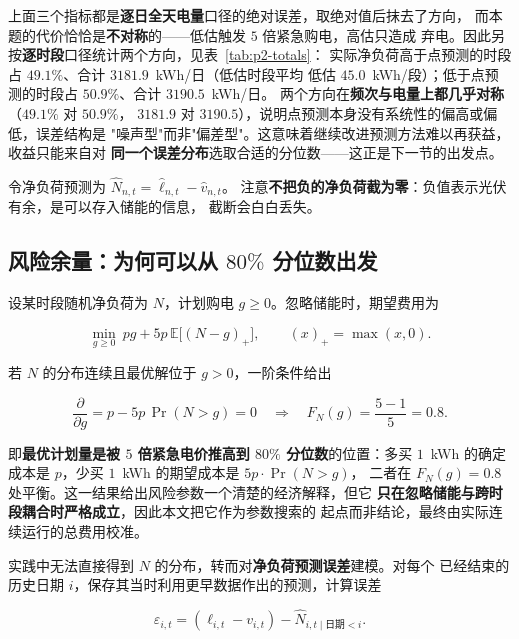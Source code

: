 \documentclass[withoutpreface,bwprint]{cumcmthesis}
\begin{document}
上面三个指标都是\textbf{逐日全天电量}口径的绝对误差，取绝对值后抹去了方向，
而本题的代价恰恰是\textbf{不对称}的——低估触发 $5$ 倍紧急购电，高估只造成
弃电。因此另按\textbf{逐时段}口径统计两个方向，见表~\ref{tab:p2-totals}：
实际净负荷高于点预测的时段占 $49.1\%$、合计 $3181.9$~kWh/日（低估时段平均
低估 $45.0$~kWh/段）；低于点预测的时段占 $50.9\%$、合计 $3190.5$~kWh/日。
两个方向在\textbf{频次与电量上都几乎对称}（$49.1\%$ 对 $50.9\%$，
$3181.9$ 对 $3190.5$），说明点预测本身没有系统性的偏高或偏低，误差结构是
"噪声型"而非"偏差型"。这意味着继续改进预测方法难以再获益，收益只能来自对
\textbf{同一个误差分布}选取合适的分位数——这正是下一节的出发点。

令净负荷预测为 $\widehat N_{n,t}=\widehat\ell_{n,t}-\widehat v_{n,t}$。
注意\textbf{不把负的净负荷截为零}：负值表示光伏有余，是可以存入储能的信息，
截断会白白丢失。

\subsection{风险余量：为何可以从 $80\%$ 分位数出发}

设某时段随机净负荷为 $N$，计划购电 $g\ge 0$。忽略储能时，期望费用为

\begin{equation}
  \min_{g\ge0}\ pg+5p\,\mathbb{E}\bigl[(N-g)_+\bigr],
  \qquad (x)_+=\max(x,0).
  \label{eq:p2-newsvendor}
\end{equation}

若 $N$ 的分布连续且最优解位于 $g>0$，一阶条件给出

\begin{equation}
  \frac{\partial}{\partial g}=p-5p\,\Pr(N>g)=0
  \quad\Longrightarrow\quad
  F_N(g)=\frac{5-1}{5}=0.8 .
  \label{eq:p2-critical}
\end{equation}

即\textbf{最优计划量是被 $5$ 倍紧急电价推高到 $80\%$ 分位数}的位置：多买
$1$~kWh 的确定成本是 $p$，少买 $1$~kWh 的期望成本是 $5p\cdot\Pr(N>g)$，
二者在 $F_N(g)=0.8$ 处平衡。这一结果给出风险参数一个清楚的经济解释，但它
\textbf{只在忽略储能与跨时段耦合时严格成立}，因此本文把它作为参数搜索的
起点而非结论，最终由实际连续运行的总费用校准。

实践中无法直接得到 $N$ 的分布，转而对\textbf{净负荷预测误差}建模。对每个
已经结束的历史日期 $i$，保存其当时利用更早数据作出的预测，计算误差

\begin{equation}
  \varepsilon_{i,t}=(\ell_{i,t}-v_{i,t})-\widehat N_{i,t\mid\text{日期}<i} .
  \label{eq:p2-error}
\end{equation}
\end{document}
